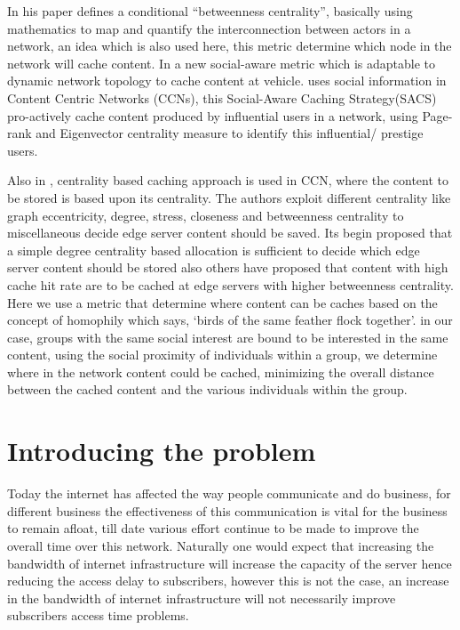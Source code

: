 In his paper \cite{pantazopoulosefficient} defines a conditional “betweenness centrality”, basically using mathematics to map and quantify the interconnection between actors in a network, an idea which is also used here, this metric determine which node in the network will cache content. In \cite{khansaving} a new social-aware metric which is adaptable to dynamic network topology to cache content at vehicle. \cite{bernardinisocially} uses social information in Content Centric Networks (CCNs), this Social-Aware Caching Strategy(SACS) pro-actively cache content produced by influential users in a network, using Page-rank and Eigenvector centrality measure to identify this influential/ prestige users. 

Also in \cite{rossisizing}, centrality based caching approach is used in CCN, where the content to be stored is based upon its centrality.  The authors exploit different centrality like graph eccentricity, degree, stress, closeness and betweenness centrality to miscellaneous decide edge server content should be saved. Its begin proposed that a simple degree centrality based allocation is sufficient to decide which edge server content should be stored also others have proposed that content with high cache hit rate are to be cached at edge servers with higher betweenness centrality. 
Here we use a metric that determine where content can be caches based on the concept of homophily which says, ‘birds of the same feather flock together’. in our case, groups with the same social interest are bound to be interested in the same content, using the social proximity of individuals within a group, we determine where in the network content could be cached, minimizing the overall distance between the cached content and the various individuals within the group.




\section{Introducing the problem}
Today the internet has affected the way people communicate and do business, for different business the effectiveness of this communication is vital for the business to remain afloat, till date various effort continue to be made to improve the overall time over this network. Naturally one would expect that increasing the bandwidth of internet infrastructure will increase the capacity of the server hence reducing the access delay to subscribers, however this is not the case, an increase in the bandwidth of internet infrastructure will not necessarily improve subscribers access time problems. 

